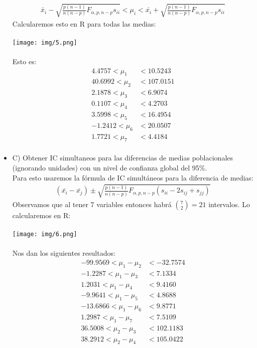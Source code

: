 \begin{sol}
\begin{itemize}
\begin{align*}
\bar{x}_i-\sqrt{\frac{p(n-1)}{n(n-p)}F_{\alpha,p,n-p}s_{ii}}<\mu_i<\bar{x_i}+\sqrt{\frac{p(n-1)}{n(n-p)}F_{\alpha,p,n-p}s_{ii}}
\end{align*}
Calcularemos esto en R para todas las medias:\\\\
\texttt{[image: img/5.png]}\\\\
Esto es:
\begin{align*}
 4.4757 < \mu_1 &< 10.5243 \\
 40.6992 < \mu_2 &< 107.0151 \\
 2.1878 < \mu_3 &< 6.9074 \\
0.1107 < \mu_4 &< 4.2703 \\
3.5998 < \mu_5 &< 16.4954 \\
 -1.2412 < \mu_6 &< 20.0507 \\
 1.7721 < \mu_7 &< 4.4184 \\
\end{align*}
\pagebreak
\item C) Obtener IC simultaneos para las diferencias de medias poblacionales (ignorando  
unidades) con un nivel de confianza global del 95\%. \\
Para esto usaremos la fórmula de IC simultáneos para la diferencia de medias:
\begin{align*}
(\bar{x_i}-\bar{x_j}) \pm \sqrt{\frac{p(n-1)}{n(n-p)}F_{\alpha,p,n-p}(s_{ii}-2s_{ij}+s_{jj})}
\end{align*}
Observamos que al tener 7 variables entonces habrá $\binom{7}{2} = 21$ intervalos. Lo calcularemos en R:\\\\
\texttt{[image: img/6.png]}\\\\
Nos dan los siguientes resultados:
\begin{align*}
 -99.9569 < \mu_{1} - \mu_{2} &< -32.7574 \\
 -1.2287 < \mu_{1} - \mu_{3} &< 7.1334 \\
 1.2031 < \mu_{1} - \mu_{4} &< 9.4160 \\
 -9.9641 < \mu_{1} - \mu_{5} &< 4.8688 \\
 -13.6866 < \mu_{1} - \mu_{6} &< 9.8771 \\
 1.2987 < \mu_{1} - \mu_{7} &< 7.5109 \\
 36.5008 < \mu_{2} - \mu_{3} &< 102.1183 \\
 38.2912 < \mu_{2} - \mu_{4} &< 105.0422 \\

\end{align*}
\end{itemize}
\end{sol}
